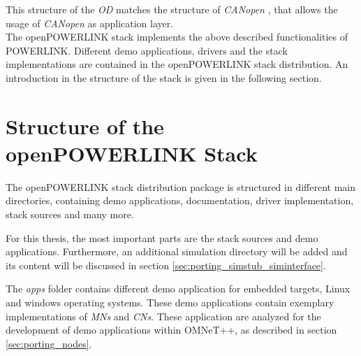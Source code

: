 This structure of the \emph{OD} matches the structure of \emph{CANopen} \cite{openpowerlink_canopen}, that allows the usage of \emph{CANopen} as application layer.
\\

The openPOWERLINK stack implements the above described functionalities of POWERLINK.
Different demo applications, drivers and the stack implementations are contained in the openPOWERLINK stack distribution.
An introduction in the structure of the stack is given in the following section.


\section{Structure of the openPOWERLINK Stack}
\label{sec:oplk_structure}
The openPOWERLINK stack distribution package is structured in different main directories, containing demo applications, documentation, driver implementation, stack sources and many more.

For this thesis, the most important parts are the stack sources and demo applications.
Furthermore, an additional simulation directory will be added and its content will be discussed in section \ref{sec:porting_simstub_siminterface}.

The \emph{apps} folder contains different demo application for embedded targets, Linux and windows operating systems.
These demo applications contain exemplary implementations of \emph{MNs} and \emph{CNs}.
These application are analyzed for the development of demo applications within OMNeT++, as described in section \ref{sec:porting_nodes}.

